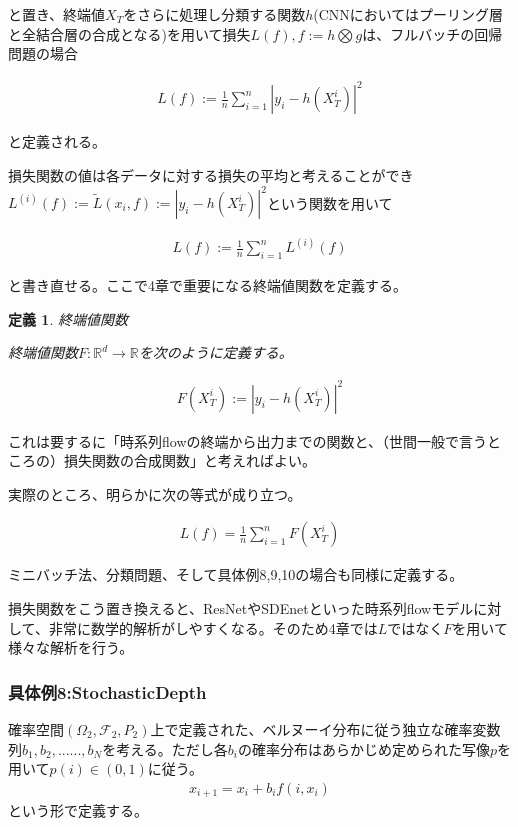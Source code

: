\documentclass{jsarticle}
\newtheorem{defi}{定義}[section]
\begin{document}
と置き、終端値$X_T$をさらに処理し分類する関数$h$(CNNにおいてはプーリング層と全結合層の合成となる)を用いて損失$L(f),f:=h\bigotimes g$は、フルバッチの回帰問題の場合

\begin{align}
L(f):=\frac{1}{n}\sum^n_{i=1}|y_i-h(X^i_T)|^2
\end{align}

と定義される。

損失関数の値は各データに対する損失の平均と考えることができ$L^{(i)}(f):=\tilde{L}(x_i,f):=|y_i-h(X^i_T)|^2$という関数を用いて

\begin{align}
L(f):=\frac{1}{n}\sum^n_{i=1} L^{(i)}(f)
\end{align}

と書き直せる。ここで4章で重要になる終端値関数を定義する。

\begin{defi} 終端値関数


終端値関数$F:\mathbb{R}^d\to\mathbb{R}$を次のように定義する。

\begin{align}
F(X^i_T):=|y_i-h(X^i_T)|^2
\end{align}


\end{defi}

これは要するに「時系列flowの終端から出力までの関数と、（世間一般で言うところの）損失関数の合成関数」と考えればよい。

実際のところ、明らかに次の等式が成り立つ。

\begin{align}
L(f)=\frac{1}{n}\sum^n_{i=1} F(X^i_T)
\end{align}

ミニバッチ法、分類問題、そして具体例8,9,10の場合も同様に定義する。

損失関数をこう置き換えると、ResNetやSDEnetといった時系列flowモデルに対して、非常に数学的解析がしやすくなる。そのため4章では$L$ではなく$F$を用いて様々な解析を行う。




\subsubsection{具体例8:StochasticDepth}
確率空間$(\Omega_2,\mathcal{F}_2,P_2)$上で定義された、ベルヌーイ分布に従う独立な確率変数列$b_1,b_2,......,b_N$を考える。ただし各$b_i$の確率分布はあらかじめ定められた写像$p$を用いて$p(i)\in(0,1)$に従う。
\begin{align}
x_{i+1}=x_{i}+b_i f(i,x_i)
\end{align}
という形で定義する。
\end{document}
